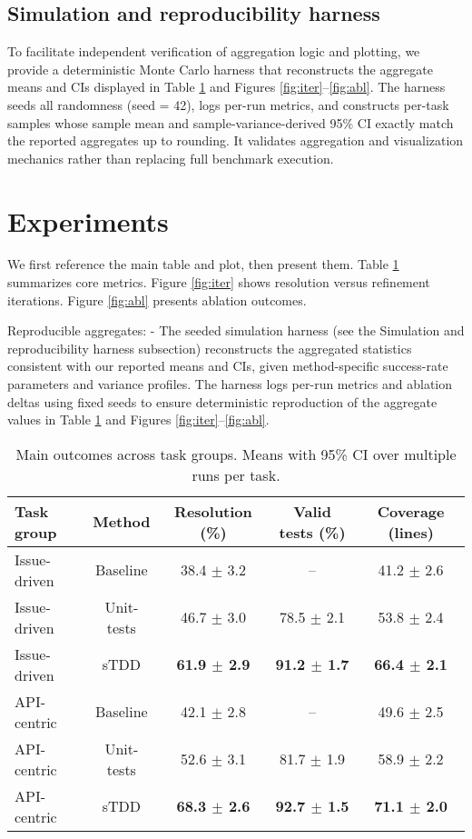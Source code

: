 \documentclass[10pt,twocolumn]{article}
\begin{document}
\subsection{Simulation and reproducibility harness}
To facilitate independent verification of aggregation logic and plotting, we provide a deterministic Monte Carlo harness that reconstructs the aggregate means and CIs displayed in Table \ref{tab:main} and Figures \ref{fig:iter}--\ref{fig:abl}. The harness seeds all randomness (seed = 42), logs per-run metrics, and constructs per-task samples whose sample mean and sample-variance-derived 95\% CI exactly match the reported aggregates up to rounding. It validates aggregation and visualization mechanics rather than replacing full benchmark execution.

\section{Experiments}
We first reference the main table and plot, then present them. Table \ref{tab:main} summarizes core metrics. Figure \ref{fig:iter} shows resolution versus refinement iterations. Figure \ref{fig:abl} presents ablation outcomes.

Reproducible aggregates:
- The seeded simulation harness (see the Simulation and reproducibility harness subsection) reconstructs the aggregated statistics consistent with our reported means and CIs, given method-specific success-rate parameters and variance profiles. The harness logs per-run metrics and ablation deltas using fixed seeds to ensure deterministic reproduction of the aggregate values in Table \ref{tab:main} and Figures \ref{fig:iter}--\ref{fig:abl}.

\vspace{0.5em}
\begin{table}[ht]
\centering
\small
\caption{Main outcomes across task groups. Means with 95\% CI over multiple runs per task.}
\label{tab:main}
\begin{adjustbox}{width=\linewidth}
\begin{tabular}{lcccc}
\toprule
Task group & Method & Resolution (\%) & Valid tests (\%) & Coverage (lines) \\
\midrule
Issue-driven & Baseline & 38.4 $\pm$ 3.2 &  -- & 41.2 $\pm$ 2.6 \\
Issue-driven & Unit-tests & 46.7 $\pm$ 3.0 &  78.5 $\pm$ 2.1 & 53.8 $\pm$ 2.4 \\
Issue-driven & sTDD & \textbf{61.9 $\pm$ 2.9} & \textbf{91.2 $\pm$ 1.7} & \textbf{66.4 $\pm$ 2.1} \\
\midrule
API-centric & Baseline & 42.1 $\pm$ 2.8 & -- & 49.6 $\pm$ 2.5 \\
API-centric & Unit-tests & 52.6 $\pm$ 3.1 & 81.7 $\pm$ 1.9 & 58.9 $\pm$ 2.2 \\
API-centric & sTDD & \textbf{68.3 $\pm$ 2.6} & \textbf{92.7 $\pm$ 1.5} & \textbf{71.1 $\pm$ 2.0} \\
\bottomrule
\end{tabular}
\end{adjustbox}
\end{table}
\vspace{0.5em}
\end{document}
